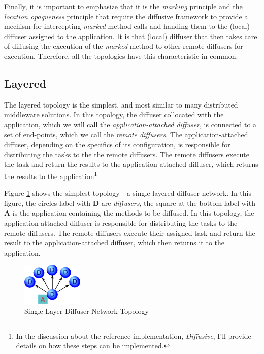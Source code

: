 \documentclass[11pt]{article}
\begin{document}
Finally, it is important to emphasize that it is the \emph{marking} principle and the \emph{location opaqueness} principle that require the diffusive framework to provide a mechism for intercepting \emph{marked} method calls and handing them to the (local) diffuser assigned to the application. It is that (local) diffuser that then takes care of diffusing the execution of the \emph{marked} method to other remote diffusers for execution. Therefore, all the topologies have this characteristic in common.

\subsection{Layered}
The layered topology is the simplest, and most similar to many distributed middleware solutions. In this topology, the diffuser collocated with the application, which we will call the \emph{application-attached diffuser}, is connected to a set of end-points, which we call the \emph{remote diffusers}. The application-attached diffuser, depending on the specifics of its configuration, is responsible for distributing the tasks to the the remote diffusers. The remote diffusers execute the task and return the results to the application-attached diffuser, which returns the results to the application\footnote{In the discussion about the reference implementation, \emph{Diffusive}, I'll provide details on how these steps can be implemented.}. 

Figure \ref{fig:topology_single_layer} shows the simplest topology---a single layered diffuser network. In this figure, the circles label with \textbf{D} are \emph{diffusers}, the square at the bottom label with \textbf{A} is the application containing the methods to be diffused. In this topology, the application-attached diffuser is responsible for distributing the tasks to the remote diffusers. The remote diffusers execute their assigned task and return the result to the application-attached diffuser, which then returns it to the application.

\begin{figure}[htbp]
\begin{center}
\includegraphics[scale=1.0]{topology_single_layer}
\caption{Single Layer Diffuser Network Topology\label{fig:topology_single_layer}}
\end{center}
\end{figure}
\end{document}

